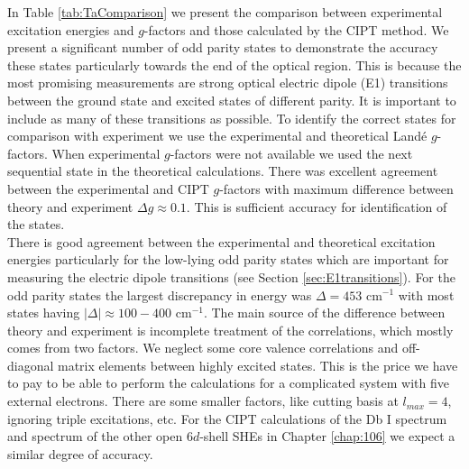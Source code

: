 \documentclass[10pt,a4paper, twoside, openright]{report}
\begin{document}
\linebreak
In Table \ref{tab:TaComparison} we present the comparison between experimental excitation energies and $g$-factors and those calculated by the CIPT method.  We present a significant number of odd parity states to demonstrate the accuracy these states particularly towards the end of the optical region. This is because the most promising measurements are strong optical electric dipole (E1) transitions between the ground state and excited states of different parity. 
It is important to include as many of these transitions as possible. To identify the correct states for comparison with experiment 
we use the experimental and theoretical Land\'{e} $g$-factors. When experimental $g$-factors were not available we used the next sequential state in the theoretical calculations. There was excellent agreement between the experimental and CIPT $g$-factors with maximum difference between theory and experiment $\Delta g \approx 0.1$. This is sufficient accuracy for identification of the states.\\
\linebreak
There is good agreement between the experimental and theoretical excitation energies particularly for the low-lying odd parity 
states which are important for measuring the electric dipole transitions (see Section \ref{sec:E1transitions}). For the odd parity
states the largest discrepancy in energy was $\Delta = 453$ cm$^{-1}$ with most states having $|\Delta| \approx 100-400$ 
cm$^{-1}$. The main source of the difference between theory and experiment is incomplete treatment of the correlations,
which mostly comes from two factors. We neglect some core valence correlations and off-diagonal matrix elements between
highly excited states. This is the price we have to pay to be able to perform the calculations for a
complicated system with five external electrons. There are some smaller factors, like cutting basis at $l_{max}=4$, 
ignoring triple excitations, etc.
For the CIPT calculations of the Db I spectrum and spectrum of the other open $6d$-shell SHEs in Chapter \ref{chap:106}  we expect a similar degree of accuracy.\\
\end{document}
